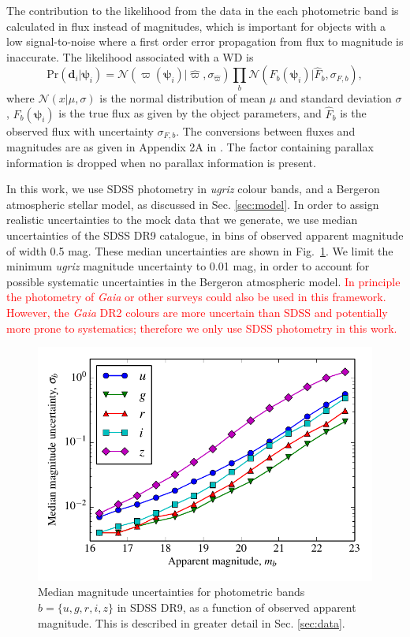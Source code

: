 \documentclass[fleqn,usenatbib]{mnras}
\newcommand{\changes}[1]{\textcolor{red}{#1}}
\newcommand{\objp}{\boldsymbol{\psi}}
\newcommand{\data}{\mathbf{d}}
\newcommand{\pr}{\text{Pr}}
\begin{document}
The contribution to the likelihood from the data in the each photometric band 
is calculated in flux instead of magnitudes, which is important for objects with a low signal-to-noise where a first order error propagation from flux to magnitude is inaccurate. The likelihood associated with a WD is
\begin{equation}
\label{eq:likelihood}
\pr(\data_i | \objp_i) = \mathcal{N}(\varpi(\objp_i)|\hat{\varpi},\sigma_{\hat{\varpi}})\prod_{b} \mathcal{N}(F_b(\objp_i)|\hat{F}_b,\sigma_{F,b}),
\end{equation}
where $\mathcal{N}(x | \mu,\sigma)$ is the normal distribution of mean $\mu$ and standard deviation $\sigma$, $F_b(\objp_i)$ is the true flux as given by the object parameters, and $\hat{F}_b$ is the observed flux with uncertainty $\sigma_{F,b}$. The conversions between fluxes and magnitudes are as given in Appendix 2A in \cite{2012MNRAS.419..390M}. The factor containing parallax information is dropped when no parallax information is present.

In this work, we use SDSS photometry in \emph{ugriz} colour bands, and a Bergeron atmospheric stellar model, as discussed in Sec. \ref{sec:model}. In order to assign realistic uncertainties to the mock data that we generate, we use median uncertainties of the SDSS DR9 catalogue, in bins of observed apparent magnitude of width 0.5 mag. These median uncertainties are shown in Fig.~\ref{fig:magnitude_error}. We limit the minimum \emph{ugriz} magnitude uncertainty to 0.01 mag, in order to account for possible systematic uncertainties in the Bergeron atmospheric model. \changes{In principle the photometry of \emph{Gaia} or other surveys could also be used in this framework. However, the \emph{Gaia}  DR2 colours are more uncertain than SDSS and potentially more prone to systematics; therefore we only use SDSS photometry in this work. }

\begin{figure}
	\includegraphics[width=\columnwidth]{median_app_errors.pdf}
    \caption{Median magnitude uncertainties for photometric bands $b=\{u,g,r,i,z\}$ in SDSS DR9, as a function of observed apparent magnitude. This is described in greater detail in Sec. \ref{sec:data}.}
    \label{fig:magnitude_error}
\end{figure}
\end{document}

